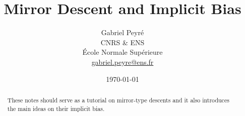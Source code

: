 \documentclass[10pt]{article}
\title{Mirror Descent and Implicit Bias}
\author{%
\begin{tabular}{c}
	Gabriel Peyr{\'e} \\ CNRS \& ENS \\
	 \'Ecole Normale Sup\'erieure \\
	 \url{gabriel.peyre@ens.fr}
\end{tabular}
}
\date{\today}
\begin{document}
 \maketitle

 \begin{abstract}
 These notes should serve as a tutorial on mirror-type descents and it also introduces the main ideas on their implicit bias.
 \end{abstract}







\end{document}
